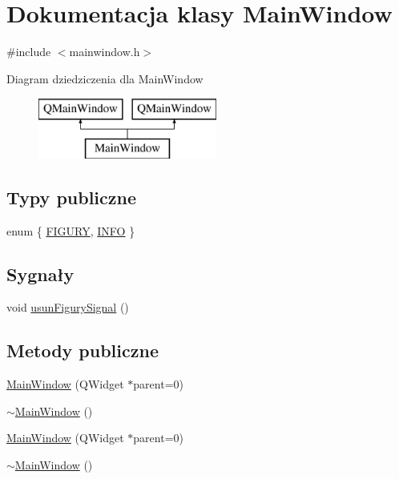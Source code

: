 \hypertarget{classMainWindow}{\section{Dokumentacja klasy Main\-Window}
\label{classMainWindow}
}


{\ttfamily \#include $<$mainwindow.\-h$>$}

Diagram dziedziczenia dla Main\-Window\begin{figure}[H]
\begin{center}
\leavevmode
\includegraphics[height=2.000000cm]{classMainWindow}
\end{center}
\end{figure}
\subsection*{Typy publiczne}
\begin{DoxyCompactItemize}
\item 
enum \{ \hyperlink{classMainWindow_ac0baac8464ccf6e6ea7e8f21f18484ffa67c2ad1aed243f6be7a551108477d9e0}{F\-I\-G\-U\-R\-Y}, 
\hyperlink{classMainWindow_ac0baac8464ccf6e6ea7e8f21f18484ffa642a5a52542d22e67554f60eda6e541d}{I\-N\-F\-O}
 \}
\end{DoxyCompactItemize}
\subsection*{Sygnały}
\begin{DoxyCompactItemize}
\item 
void \hyperlink{classMainWindow_a5375b14904048c4f5c258183999afbf3}{usun\-Figury\-Signal} ()
\end{DoxyCompactItemize}
\subsection*{Metody publiczne}
\begin{DoxyCompactItemize}
\item 
\hyperlink{classMainWindow_a8b244be8b7b7db1b08de2a2acb9409db}{Main\-Window} (Q\-Widget $\ast$parent=0)
\item 
\hyperlink{classMainWindow_ae98d00a93bc118200eeef9f9bba1dba7}{$\sim$\-Main\-Window} ()
\item 
\hyperlink{classMainWindow_a8b244be8b7b7db1b08de2a2acb9409db}{Main\-Window} (Q\-Widget $\ast$parent=0)
\item 
\hyperlink{classMainWindow_ae98d00a93bc118200eeef9f9bba1dba7}{$\sim$\-Main\-Window} ()
\end{DoxyCompactItemize}
